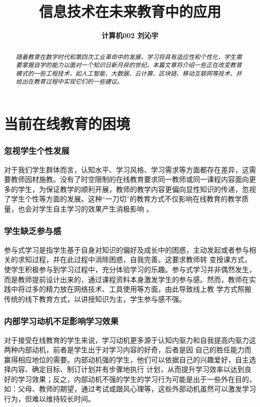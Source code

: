 \documentclass[UTF8]{ctexart}
\title{\textbf{信息技术在未来教育中的应用}}
\author{\textbf{\kaishu 计算机002 刘沁宇}}
\begin{document}
	\maketitle
	\date{}
	\begin{abstract}
		\textit{随着教育在数字时代和第四次工业革命中的发展，学习将具有适应性和个性化，学生需要掌握自学的能力以面对一个知识日新月异的世纪。本篇文章将介绍一些正在改变教育模式的一些工程技术，如人工智能、大数据、云计算、区块链、移动互联网等技术，并给出在教育过程中实现它们的一些建议。}		
	\end{abstract}

	\section{当前在线教育的困境}
		\subsubsection{\textbf{忽视学生个性发展}}
		对于我们学生群体而言，认知水平、学习风格、学习需求等方面都存在差异，这需要教师因材施教。没有了时空限制的在线教育要求同一教师或同一课程内容面向更多的学生，为保证教学的顺利开展，教师的教学内容更偏向显性知识的传递，忽视了学生个性等方面的发展。这种“一刀切”的教育方式不仅影响在线教育的教学质量，也会对学生自主学习的效果产生消极影响 。
		\subsubsection{\textbf{学生缺乏参与感}}
		参与式学习是指学生基于自身对知识的偏好及成长中的困惑，主动发起或者参与相关的求知过程，并在此过程中消除困惑，自我完善。这要求教师转
		变授课方式，使学生积极参与到学习过程中，充分体验学习的乐趣。参与式学习并非偶然发生，而是教师提前设计出来的，通过课程资料本身激发学生的参与感。然而，教师在实践中将过多的精力放在网络技术、工具使用等方面，由此导致线上教
		学方式照搬传统的线下教育方式，以讲授知识为主，学生参与感不强。
		\subsubsection{\textbf{内部学习动机不足影响学习效果}}
		对于接受在线教育的学生来说，学习动机更多源于认知内驱力和自我提高内驱力这两种内部动机，前者是学生出于对学习内容的好奇，后者是因
		自己的胜任能力而赢得相应地位的需要。内部动机强的学生，他们可以依据自己的兴趣爱好，自主选择内容、确定目标、制订计划并有步骤地执行
		计划，从而提升学习效率以达到良好的学习效果；反之，内部动机不强的学生的学习行为可能是出于一些外在目的，如：父母、教师的期望，通过考试或跟风心理等，这些外部动机虽然可以激发学习行为，但难以维持较长时间。 
	
\end{document}
